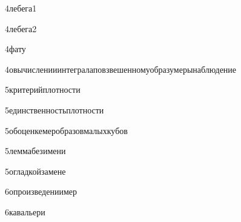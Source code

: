 {4}{лебега1}

{4}{лебега2}

{4}{фату}

{4}{овычисленииинтегралаповзвешенномуобразумерынаблюдение}

{5}{критерийплотности}

{5}{единственностьплотности}

{5}{обоценкемеробразовмалыхкубов}

{5}{леммабезимени}

{5}{огладкойзамене}

{6}{опроизведениимер}

{6}{кавальери}














